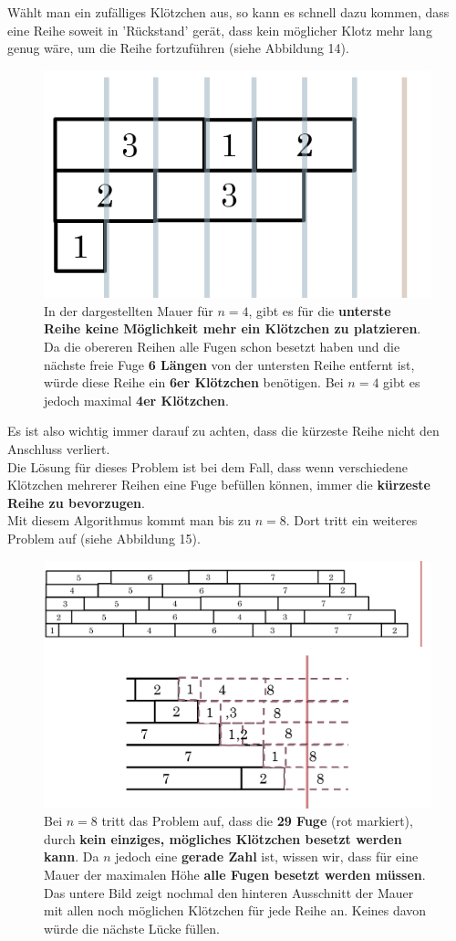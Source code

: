 \documentclass[a4paper,12pt]{article}
\begin{document}
Wählt man ein zufälliges Klötzchen aus, so kann es schnell dazu kommen, dass eine Reihe soweit in 'Rückstand' gerät, dass kein möglicher Klotz mehr lang genug wäre, um die Reihe fortzuführen (siehe Abbildung 14).
\begin{figure}[H]
    \centering
    \includegraphics[width=0.7\linewidth]{Bilder/Aufgabe1/Problem_Mauerbauart_02_RowSum.png}
    \caption{In der dargestellten Mauer für $n = 4$, gibt es für die \textbf{unterste Reihe keine Möglichkeit mehr ein Klötzchen zu platzieren}. Da die obereren Reihen alle Fugen schon besetzt haben und die nächste freie Fuge \textbf{6 Längen} von der untersten Reihe entfernt ist, würde diese Reihe ein \textbf{6er Klötzchen} benötigen. Bei $n = 4$ gibt es jedoch maximal \textbf{4er Klötzchen}.}
\end{figure}
Es ist also wichtig immer darauf zu achten, dass die kürzeste Reihe nicht den Anschluss verliert.
\\[0.4cm]
Die Lösung für dieses Problem ist bei dem Fall, dass wenn verschiedene Klötzchen mehrerer Reihen eine Fuge befüllen können, immer die \textbf{kürzeste Reihe zu bevorzugen}.
\\[0.4cm]
Mit diesem Algorithmus kommt man bis zu $n = 8$. Dort tritt ein weiteres Problem auf (siehe Abbildung 15).
\begin{figure}[H]
    \centering
    \includegraphics[width=1\linewidth]{Bilder/Aufgabe1/Problem_Mauerbauart_02_Kein_Klotz.png}
    \caption{Bei $n = 8$ tritt das Problem auf, dass die \textbf{29 Fuge} (rot markiert), durch \textbf{kein einziges, mögliches Klötzchen besetzt werden kann}. Da $n$ jedoch eine \textbf{gerade Zahl} ist, wissen wir, dass für eine Mauer der maximalen Höhe \textbf{alle Fugen besetzt werden müssen}. Das untere Bild zeigt nochmal den hinteren Ausschnitt der Mauer mit allen noch möglichen Klötzchen für jede Reihe an. Keines davon würde die nächste Lücke füllen.}
\end{figure}
\end{document}
